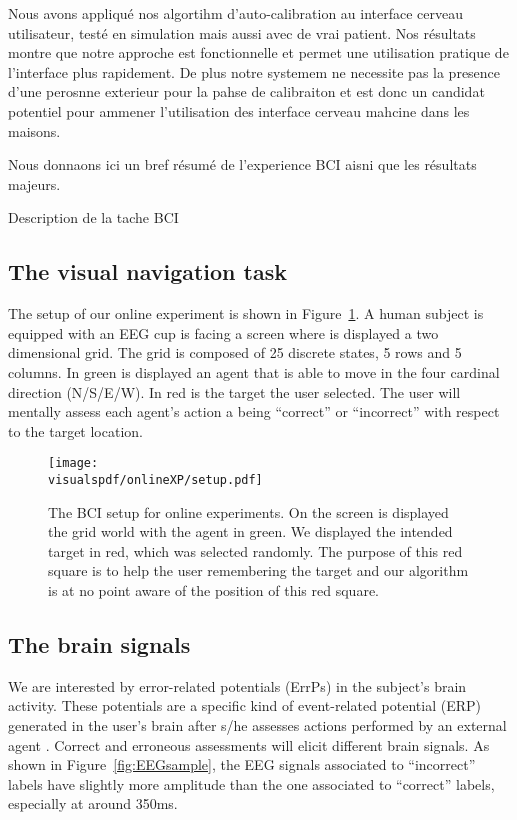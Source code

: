 Nous avons appliqué nos algortihm d'auto-calibration au interface cerveau utilisateur, testé en simulation mais aussi avec de vrai patient. Nos résultats montre que notre approche est fonctionnelle et permet une utilisation pratique  de l'interface plus rapidement. De plus notre systemem ne necessite pas la presence d'une perosnne exterieur pour la pahse de calibraiton et est donc un candidat potentiel pour ammener l'utilisation des interface cerveau mahcine dans les maisons.

Nous donnaons ici un bref résumé de l'experience BCI aisni que les résultats majeurs.

Description de la tache BCI

\subsection{The visual navigation task}

The setup of our online experiment is shown in Figure~\ref{fig:BCIsetup}. A human subject is equipped with an EEG cup is facing a screen where is displayed a two dimensional grid. The grid is composed of 25 discrete states, 5 rows and 5 columns. In green is displayed an agent that is able to move in the four cardinal direction (N/S/E/W). In red is the target the user selected. The user will mentally assess each agent's action a being ``correct'' or ``incorrect'' with respect to the target location.

\begin{figure}[!htbp]
\centering
\texttt{[image: \\visualspdf/onlineXP/setup.pdf]}
\caption{The BCI setup for online experiments. On the screen is displayed the grid world with the agent in green. We displayed the intended target in red, which was selected randomly. The purpose of this red square is to help the user remembering the target and our algorithm is at no point aware of the position of this red square.}
\label{fig:BCIsetup}
\end{figure}

\subsection{The brain signals}

We are interested by error-related potentials (ErrPs) in the subject's brain activity. These potentials are a specific kind of event-related potential (ERP) generated in the user's brain after s/he assesses actions performed by an external agent \cite{chavarriaga2010learning}. Correct and erroneous assessments will elicit different brain signals. As shown in Figure~\ref{fig:EEGsample}, the EEG signals associated to ``incorrect'' labels have slightly more amplitude than the one associated to ``correct'' labels, especially at around 350ms.

